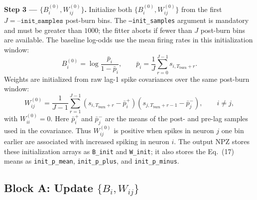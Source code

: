 \documentclass[11pt]{article}
\begin{document}
\textbf{Step 3 --- $\{B_i^{(0)}, W_{ij}^{(0)}\}$.}
Initialize both $\{B_i^{(0)},W_{ij}^{(0)}\}$ from the first
$J=\texttt{--init\_samples}$ post-burn bins.
The \texttt{--init\_samples} argument is mandatory and must be greater than
$1000$; the fitter aborts if fewer than $J$ post-burn bins are available.
The baseline log-odds use the mean firing rates in this initialization window:
\begin{equation}
    B_i^{(0)} = \log\frac{\bar{p}_i}{1-\bar{p}_i}, \qquad
    \bar{p}_i = \frac{1}{J}\sum_{r=0}^{J-1} s_{i,T_\text{burn}+r}.
\end{equation}
Weights are initialized from raw lag-1 spike covariances over the same
post-burn window:
\begin{equation}
    W_{ij}^{(0)} =
    \frac{1}{J-1}\sum_{r=1}^{J-1}
    \left(s_{i,T_\text{burn}+r}-\bar{p}^{+}_i\right)
    \left(s_{j,T_\text{burn}+r-1}-\bar{p}^{-}_j\right),
    \qquad i\neq j,
\end{equation}
with $W_{ii}^{(0)}=0$. Here $\bar{p}^{+}_i$ and $\bar{p}^{-}_j$ are the
means of the post- and pre-lag samples used in the covariance. Thus
$W_{ij}^{(0)}$ is positive when spikes in neuron $j$ one bin earlier are
associated with increased spiking in neuron $i$.
The output NPZ stores these initialization arrays as \texttt{B\_init} and
\texttt{W\_init}; it also stores the Eq.~(17) means as
\texttt{init\_p\_mean}, \texttt{init\_p\_plus}, and
\texttt{init\_p\_minus}.

\subsection{Block A: Update $\{B_i, W_{ij}\}$}
\label{sec:block_a}
\end{document}
